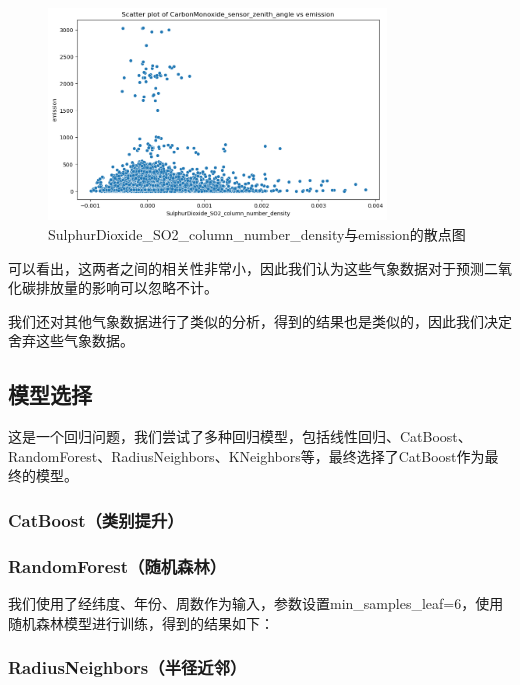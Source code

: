 \documentclass[fontset=windows]{ctexart}
\begin{document}
\begin{figure}[H]
      \centering
      \includegraphics[width=0.8\textwidth]{output1.png}
      \caption{SulphurDioxide\_SO2\_column\_number\_density与emission的散点图}
\end{figure}

可以看出，这两者之间的相关性非常小，因此我们认为这些气象数据对于预测二氧化碳排放量的影响可以忽略不计。

我们还对其他气象数据进行了类似的分析，得到的结果也是类似的，因此我们决定舍弃这些气象数据。

\subsection{模型选择}

这是一个回归问题，我们尝试了多种回归模型，包括线性回归、CatBoost、RandomForest、RadiusNeighbors、KNeighbors等，最终选择了CatBoost作为最终的模型。


\subsubsection{CatBoost（类别提升）}

\subsubsection{RandomForest（随机森林）}

我们使用了经纬度、年份、周数作为输入，参数设置min\_samples\_leaf=6，使用随机森林模型进行训练，得到的结果如下：

\subsubsection{RadiusNeighbors（半径近邻）}
\end{document}
